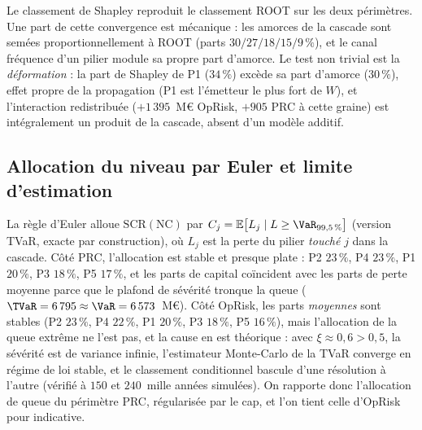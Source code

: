 Le classement de Shapley reproduit le classement ROOT sur les deux périmètres. Une part de
cette convergence est mécanique : les amorces de la cascade sont semées
proportionnellement à ROOT (parts $30/27/18/15/9\,\%$),
et le canal fréquence d'un pilier
module sa propre part d'amorce. Le test non trivial est la \emph{déformation} : la part de
Shapley de P1 ($34\,\%$) excède sa part d'amorce ($30\,\%$), effet propre de la propagation
(P1 est l'émetteur le plus fort de $W$), et l'interaction redistribuée ($+1\,395$~M\euro{}
OpRisk, $+905$ PRC à cette graine) est intégralement un produit de la cascade, absent d'un
modèle additif.

\subsection{Allocation du niveau par Euler et limite d'estimation}

La règle d'Euler \citep{tasche1999} alloue $\mathrm{SCR}(\text{NC})$ par
$C_j = \mathbb{E}\bigl[L_j \mid L \ge \VaR_{99{,}5\,\%}\bigr]$ (version TVaR, exacte
par construction), où $L_j$ est la perte du pilier \emph{touché} $j$ dans la cascade. Côté
PRC, l'allocation est stable et presque plate : P2 $23\,\%$, P4 $23\,\%$, P1 $20\,\%$,
P3 $18\,\%$, P5 $17\,\%$, et les parts de capital coïncident avec les parts de perte moyenne
parce que le plafond de sévérité tronque la queue
($\TVaR = 6\,795 \approx \VaR = 6\,573$~M\euro). Côté OpRisk, les parts
\emph{moyennes} sont stables (P2 $23\,\%$, P4 $22\,\%$, P1 $20\,\%$, P3 $18\,\%$,
P5 $16\,\%$), mais l'allocation de la queue extrême ne l'est pas, et la cause en est
théorique : avec $\xi \approx 0{,}6 > 0{,}5$, la sévérité est de variance infinie,
l'estimateur Monte-Carlo de la TVaR converge en régime de loi stable, et le classement
conditionnel bascule d'une résolution à l'autre (vérifié à $150$ et $240$~mille années
simulées). On rapporte donc l'allocation de queue du périmètre PRC, régularisée par le cap,
et l'on tient celle d'OpRisk pour indicative.

